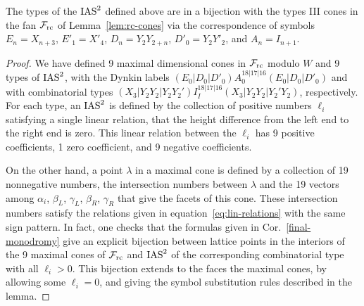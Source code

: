 \documentclass[table,x11names]{amsart}
\begin{document}
\begin{lemma}
  The types of the $\operatorname{IAS}^2$ defined above are in a bijection with the
  types III cones in the fan ${\mathcal F}_{\rm rc}$ of Lemma~\ref{lem:rc-cones} via
  the correspondence of symbols 
  $E_n=X_{n+3}$, $E'_1=X'_4$, $D_n=Y_2Y_{2+n}$, $D'_0=Y_2Y'_2$,
and $A_n=I_{n+1}$.
\end{lemma}

\begin{proof} 
  We have defined 9 maximal dimensional cones in $\mathcal{F}_{\rm rc}$ modulo
  $W$ and 9 types of $\operatorname{IAS}^2$, with the Dynkin labels
  $(E_0|D_0|D'_0)A_0^{18|17|16}(E_0|D_0|D'_0)$ and with
  combinatorial types $(X_3|Y_2Y_2|Y_2Y_2')I_I^{18|17|16}(X_3|Y_2Y_2|Y_2'Y_2)$,
  respectively. For each type, an
  $\operatorname{IAS}^2$ is defined by the collection of positive numbers $\ell_i$
  satisfying a single linear relation, that the height difference from
  the left end to the right end is zero. This linear relation between the $\ell_i$
  has 9 positive coefficients, 1 zero coefficient, and 9 negative coefficients.

  On the other hand, a point $\lambda$ in a maximal cone is defined by
  a collection of 19 nonnegative numbers, the intersection numbers
  between $\lambda$ and the 19 vectors among $\alpha_i$, $\beta_L$,
  $\gamma_L$, $\beta_R$, $\gamma_R$ that give the facets of this
  cone. These intersection numbers satisfy the relations given in
  equation~\eqref{eq:lin-relations} with the same sign pattern.  In fact,
  one checks that the formulas given in Cor.~\ref{final-monodromy}
  give an explicit bijection between lattice points in the interiors of the 9
  maximal cones of $\mathcal{F}_{\rm rc}$ and $\operatorname{IAS}^2$
  of the corresponding combinatorial type with all $\ell_i>0$. This
   bijection extends to the faces the maximal cones, by allowing some
   $\ell_i=0$, and giving the symbol substitution rules described in the lemma.
\end{proof}







\end{document}
